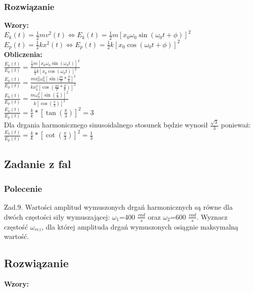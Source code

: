 \documentclass[a4paper,14pt]{extarticle}  %
\begin{document}
            \subsubsection{Rozwiązanie}
                \textbf{Wzory:}\\
                $E_k(t)=\frac{1}{2}mv^2(t)\Leftrightarrow E_k(t)=\frac{1}{2}m[x_0\omega _0\sin(\omega_0t+\phi)]^2$\\
                $E_p(t)=\frac{1}{2}kx^2(t)\Leftrightarrow E_p(t)=\frac{1}{2}k[x_0\cos(\omega_0t+\phi)]^2$\\
                \textbf{Obliczenia:}\\
                $\frac{E_k(t)}{E_p(t)}=\frac{\frac{1}{2}m[x_0\omega _0\sin(\omega_0t)]^2}{\frac{1}{2}k[x_0\cos(\omega_0t)]^2}$\\
                $\frac{E_k(t)}{E_p(t)}=\frac{mx_0^2\omega_0^2[\sin(\frac{2\pi}{T}*\frac{T}{6}]^2}{kx_0^2[\cos(\frac{2\pi}{T}*\frac{T}{6})]^2}$\\
                $\frac{E_k(t)}{E_p(t)}=\frac{m\omega _0^2[\sin(\frac{\pi}{3})]^2}{k[\cos(\frac{\pi}{3})]^2}$\\
                $\frac{E_k(t)}{E_p(t)}=\frac{k}{k}*[\tan(\frac{\pi}{3})]^2 = 3$\\
                Dla drgania harmonicznego sinusoidalnego stosunek będzie wynosił $\frac{\sqrt{3}}{3}$ ponieważ:\\
                $\frac{E_k(t)}{E_p(t)}=\frac{k}{k}*[\cot(\frac{\pi}{3})]^2 = \frac{1}{3}$\\
                \clearpage
        \subsection{Zadanie z fal}
            \subsubsection{Polecenie}
                Zad.9. Wartości amplitud wymuszonych drgań harmonicznych są równe dla dwóch częstości siły wymuszającej: 
                $\omega_1$=400 $\frac{rad}{s}$ oraz $\omega_2$=600 $\frac{rad}{s}$. 
                Wyznacz częstość $\omega_{rez}$, dla której amplituda drgań wymuszonych osiągnie maksymalną wartość.
            \subsection{Rozwiązanie}
                \textbf{Wzory:}\\
                
\end{document}
